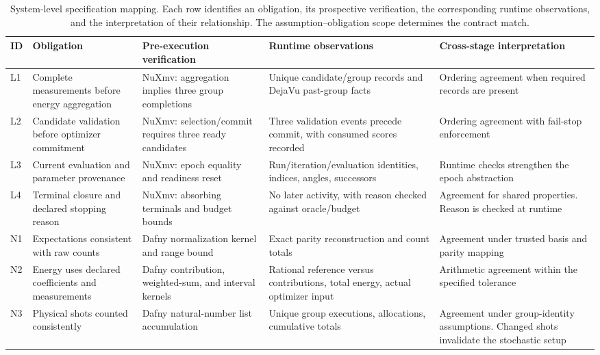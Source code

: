 \documentclass[conference]{IEEEtran}
\begin{document}
\begin{table}[!t]
\centering\footnotesize
\caption{System-level specification mapping. Each row identifies an obligation, its prospective verification, the corresponding runtime observations, and the interpretation of their relationship. The assumption--obligation scope determines the contract match.}
\label{tab:mapping}
\begin{tabularx}{\textwidth}{@{}p{}>{\raggedright\arraybackslash}p{}>{\raggedright\arraybackslash}p{}>{\raggedright\arraybackslash}p{}Y@{}}
\toprule
ID & Obligation & Pre-execution verification & Runtime observations & Cross-stage interpretation \\
\midrule
L1 & Complete measurements before energy aggregation & NuXmv: aggregation implies three group completions & Unique candidate/group records and DejaVu past-group facts & Ordering agreement when required records are present \\
L2 & Candidate validation before optimizer commitment & NuXmv: selection/commit requires three ready candidates & Three validation events precede commit, with consumed scores recorded & Ordering agreement with fail-stop enforcement \\
L3 & Current evaluation and parameter provenance & NuXmv: epoch equality and readiness reset & Run/iteration/evaluation identities, indices, angles, successors & Runtime checks strengthen the epoch abstraction \\
L4 & Terminal closure and declared stopping reason & NuXmv: absorbing terminals and budget bounds & No later activity, with reason checked against oracle/budget & Agreement for shared properties. Reason is checked at runtime \\
N1 & Expectations consistent with raw counts & Dafny normalization kernel and range bound & Exact parity reconstruction and count totals & Agreement under trusted basis and parity mapping \\
N2 & Energy uses declared coefficients and measurements & Dafny contribution, weighted-sum, and interval kernels & Rational reference versus contributions, total energy, actual optimizer input & Arithmetic agreement within the specified tolerance \\
N3 & Physical shots counted consistently & Dafny natural-number list accumulation & Unique group executions, allocations, cumulative totals & Agreement under group-identity assumptions. Changed shots invalidate the stochastic setup \\

\end{tabularx}
\end{table}
\end{document}
